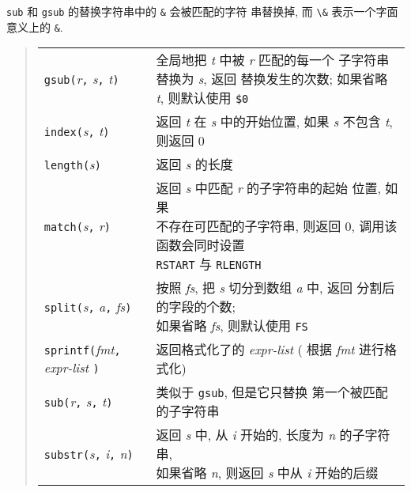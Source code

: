 \texttt{sub} 和 \texttt{gsub} 的替换字符串中的 \verb'&' 会被匹配的字符
串替换掉, 而 \verb'\&' 表示一个字面意义上的 \verb'&'.
\begin{quote}
    \begin{tabular}{ll}
        \texttt{gsub(}\textit{r}\texttt{,} \textit{s}\texttt{,}
        \textit{t}\texttt{)} &
        \makecell[tl]{全局地把 \textit{t} 中被 \textit{r} 匹配的每一个
        子字符串替换为 \textit{s}, 返回 \\
        替换发生的次数; 如果省略 \textit{t}, 则默认使用 \texttt{\$0}} \\

        \texttt{index(}\textit{s}\texttt{,} \textit{t}\texttt{)} &
        返回 \textit{t} 在 \textit{s} 中的开始位置, 如果 \textit{s}
        不包含 \textit{t}, 则返回 0 \\

        \texttt{length(}\textit{s}\texttt{)} & 返回 \textit{s} 的长度 \\

        \texttt{match(}\textit{s}\texttt{,} \textit{r}\texttt{)} &
        \makecell[tl]{返回 \textit{s} 中匹配 \textit{r} 的子字符串的起始
        位置, 如果 \\ 不存在可匹配的子字符串, 则返回 0,
        调用该函数会同时设置 \\ \texttt{RSTART} 与 \texttt{RLENGTH}} \\

        \texttt{split(}\textit{s}\texttt{,} \textit{a}\texttt{,}
        \textit{fs}\texttt{)} & \makecell[tl]{按照 \textit{fs}, 把
        \textit{s} 切分到数组 \textit{a} 中, 返回 
        分割后的字段的个数;\\ 如果省略 \textit{fs}, 则默认使用
        \texttt{FS}} \\

        \texttt{sprintf(}\textit{fmt}\texttt{,} \textit{expr-list}
        \texttt{)} & 返回格式化了的 \textit{expr-list} (
        根据 \textit{fmt} 进行格式化) \\

        \texttt{sub(}\textit{r}\texttt{,} \textit{s}\texttt{,}
        \textit{t}\texttt{)}   & 类似于 \texttt{gsub}, 但是它只替换
        第一个被匹配的子字符串 \\

        \texttt{substr(}\textit{s}\texttt{,} \textit{i}\texttt{,}
        \textit{n}\texttt{)} & \makecell[tl]{返回 \textit{s} 中, 从
        \textit{i} 开始的, 长度为 \textit{n} 的子字符串, \\ 
        如果省略 \textit{n}, 则返回
        \textit{s} 中从 \textit{i} 开始的后缀} \\
    \end{tabular}
\end{quote}

